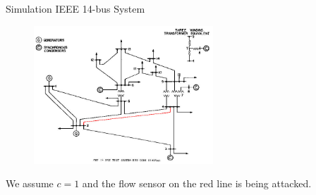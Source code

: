 \documentclass[10pt]{beamer}
\begin{document}
\begin{frame}{Simulation IEEE 14-bus System}
  \begin{figure}[ht]
    \centering
    \includegraphics[width=0.60\textwidth]{ieee14.jpg}
  \end{figure}
  We assume $c=1$ and the flow sensor on the red line is being attacked.
\end{frame}
\end{document}
